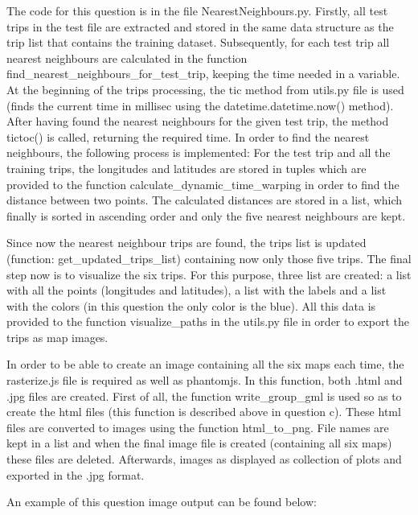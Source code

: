 \documentclass[12pt]{article}
\begin{document}
	The code for this question is in the file NearestNeighbours.py. Firstly, all test trips in the test file are extracted and stored in the same data structure as the trip list that contains the training dataset. Subsequently, for each test trip all nearest neighbours are calculated in the function find\_nearest\_neighbours\_for\_test\_trip, keeping the time needed in a variable. At the beginning of the trips processing, the tic method from utils.py file is used (finds the current time in millisec using the datetime.datetime.now() method). After having found the nearest neighbours for the given test trip, the method tictoc() is called, returning the required time. In order to find the nearest neighbours, the following process is implemented: For the test trip and all the training trips, the longitudes and latitudes are stored in tuples which are provided to the function calculate\_dynamic\_time\_warping in order to find the distance between two points. The calculated distances are stored in a list, which finally is sorted in ascending order and only the five nearest neighbours are kept.
	
	Since now the nearest neighbour trips are found, the trips list is updated (function: get\_updated\_trips\_list) containing now only those five trips. The final step now is to visualize the six trips. For this purpose, three list are created: a list with all the points (longitudes and latitudes), a list with the labels and a list with the colors (in this question the only color is the blue). All this data is provided to the function visualize\_paths in the utils.py file in order to export the trips as map images.
	
	In order to be able to create an image containing all the six maps each time, the rasterize.js file is required as well as phantomjs. In this function, both .html and .jpg files are created. First of all, the function write\_group\_gml is used so as to create the html files (this function is described above in question c). These html files are converted to images using the function html\_to\_png. File names are kept in a list and when the final image file is created (containing all six maps) these files are deleted. Afterwards, images as displayed as collection of plots and exported in the .jpg format.
	
	An example of this question image output can be found below:
	
\end{document}

